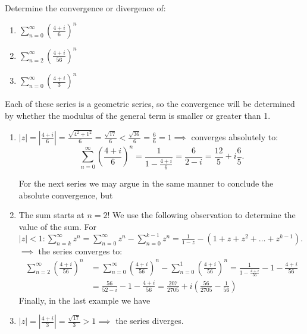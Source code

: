 \begin{example}\label{example:15.1} 
    Determine the convergence or divergence of:
    \begin{enumerate}
        \item $\sum_{n=0}^{\infty} \left(\frac{4+i}{6}\right)^n$
        \item $\sum_{n=2}^{\infty} \left(\frac{4+i}{56}\right)^n$
        \item $\sum_{n=0}^{\infty} \left(\frac{4+i}{3}\right)^n$
    \end{enumerate}

Each of these series is a geometric series, so the convergence will be determined by whether the modulus of the general term is smaller or greater than 1.

\begin{soln}

\begin{enumerate}[wide, labelwidth=!, labelindent=0pt]
    \item  $|z| = \left|\frac{4+i}{6}\right| = \frac{\sqrt{4^2 + 1^2}}{6} = \frac{\sqrt{17}}{6} < \frac{\sqrt{36}}{6} = \frac{6}{6} = 1 \implies$ converges absolutely to: 
    \[\sum_{n=0}^{\infty} \left(\frac{4+i}{6}\right)^n = \frac{1}{1 - \frac{4+i}{6}} = \frac{6}{2-i} = \frac{12}{5} + i\frac{6}{5}.\]

    \noindent For the next series we may argue in the same manner to conclude the absolute convergence, but 
    \item The sum starts at $n=2$! We use the following observation to determine the value of the sum. For $|z| < 1: \sum_{n=k}^{\infty} z^n = \sum_{n=0}^{\infty} z^n - \sum_{n=0}^{k-1} z^n = \frac{1}{1-z} - (1 + z + z^2 + \dots + z^{k-1})$.
    $\implies$ the series converges to:
    \begin{align*} 
        \sum_{n=2}^{\infty} \left(\frac{4+i}{56}\right)^n & = \sum_{n=0}^{\infty} \left(\frac{4+i}{56}\right)^n - \sum_{n=0}^{1} \left(\frac{4+i}{56}\right)^n = \frac{1}{1 - \frac{4+i}{56}} - 1 - \frac{4+i}{56} \\ 
        & = \frac{56}{52-i} - 1 - \frac{4+i}{56} = \frac{207}{2705} + i\left(\frac{56}{2705} - \frac{1}{56}\right) 
    \end{align*}
    \noindent Finally, in the last example we have 
    \item $|z| = \left|\frac{4+i}{3}\right| = \frac{\sqrt{17}}{3} > 1 \implies$ the series diverges.
\end{enumerate}
\end{soln}
\end{example}

